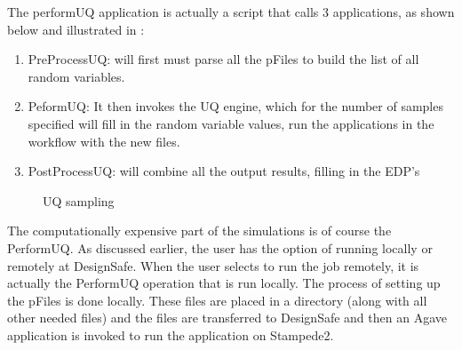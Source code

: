 The performUQ application is actually a script that calls 3
applications, as shown below and illustrated in :
\begin{enumerate}
\item PreProcessUQ: will first must parse all the pFiles to build the
  list of all random variables.
\item PeformUQ: It then invokes the UQ engine, which for the number of
  samples specified will fill in the random variable values, run the
  applications in the workflow with the new files.
\item PostProcessUQ: will combine all the output results, filling in
  the EDP’s
\end{enumerate}

\begin{figure}[!htbp]
  \caption{UQ sampling}
  \label{fig:uq_sampling}
\end{figure}

The computationally expensive part of the simulations is of course the
PerformUQ. As discussed earlier, the user has the option of running
locally or remotely at DesignSafe. When the user selects to run the
job remotely, it is actually the PerformUQ operation that is run
locally. The process of setting up the pFiles is done locally. These
files are placed in a directory (along with all other needed files)
and the files are transferred to DesignSafe and then an Agave
application is invoked to run the application on Stampede2.
